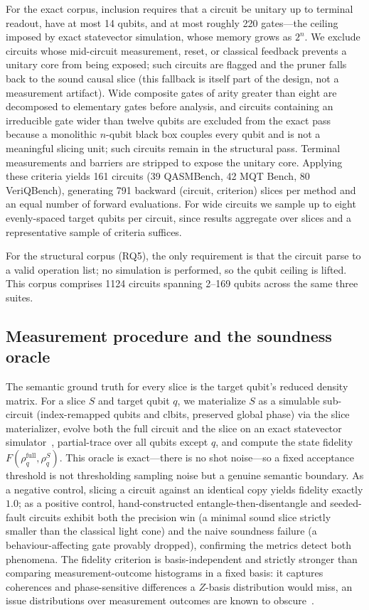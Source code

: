 \documentclass[10pt,conference]{IEEEtran}
\theoremstyle{definition}
\begin{document}
For the exact corpus, inclusion requires that a circuit be unitary up to terminal readout, have at most 14 qubits, and at most roughly 220 gates---the ceiling imposed by exact statevector simulation, whose memory grows as $2^{n}$. We exclude circuits whose mid-circuit measurement, reset, or classical feedback prevents a unitary core from being exposed; such circuits are flagged and the pruner falls back to the sound causal slice (this fallback is itself part of the design, not a measurement artifact). Wide composite gates of arity greater than eight are decomposed to elementary gates before analysis, and circuits containing an irreducible gate wider than twelve qubits are excluded from the exact pass because a monolithic $n$-qubit black box couples every qubit and is not a meaningful slicing unit; such circuits remain in the structural pass. Terminal measurements and barriers are stripped to expose the unitary core. Applying these criteria yields 161 circuits (39 QASMBench, 42 MQT Bench, 80 VeriQBench), generating 791 backward (circuit, criterion) slices per method and an equal number of forward evaluations. For wide circuits we sample up to eight evenly-spaced target qubits per circuit, since results aggregate over slices and a representative sample of criteria suffices.

For the structural corpus (RQ5), the only requirement is that the circuit parse to a valid operation list; no simulation is performed, so the qubit ceiling is lifted. This corpus comprises 1124 circuits spanning 2--169 qubits across the same three suites.

\subsection{Measurement procedure and the soundness oracle}
The semantic ground truth for every slice is the target qubit's reduced density matrix. For a slice $S$ and target qubit $q$, we materialize $S$ as a simulable sub-circuit (index-remapped qubits and clbits, preserved global phase) via the slice materializer, evolve both the full circuit and the slice on an exact statevector simulator~\cite{qiskit2025, ibm2024qasmsim}, partial-trace over all qubits except $q$, and compute the state fidelity $F(\rho_q^{\text{full}},\rho_q^{S})$. This oracle is exact---there is no shot noise---so a fixed acceptance threshold is not thresholding sampling noise but a genuine semantic boundary. As a negative control, slicing a circuit against an identical copy yields fidelity exactly $1.0$; as a positive control, hand-constructed entangle-then-disentangle and seeded-fault circuits exhibit both the precision win (a minimal sound slice strictly smaller than the classical light cone) and the naive soundness failure (a behaviour-affecting gate provably dropped), confirming the metrics detect both phenomena. The fidelity criterion is basis-independent and strictly stronger than comparing measurement-outcome histograms in a fixed basis: it captures coherences and phase-sensitive differences a $Z$-basis distribution would miss, an issue distributions over measurement outcomes are known to obscure~\cite{gong2023learning, nielsen2010quantum, horodecki2009entanglement}.
\end{document}
